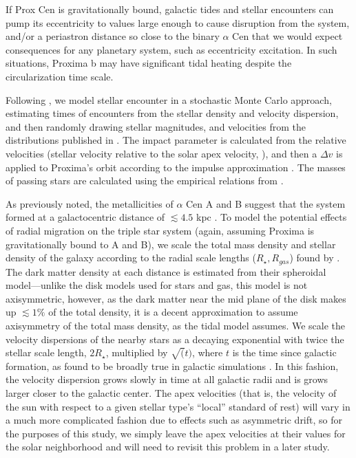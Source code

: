 \documentclass[preprint,12pt]{aastex}
\begin{document}
If Prox Cen is gravitationally bound, galactic tides and stellar 
encounters can pump its eccentricity to values large enough to 
cause disruption from the system, and/or a periastron distance 
so close to the binary $\alpha$ Cen that we would expect 
consequences for any planetary system, such as eccentricity 
excitation. In such situations, Proxima b may have significant tidal 
heating despite the circularization time scale. 

Following \cite{Heisler1987,Rickman2008}, we model stellar
encounter in a stochastic Monte Carlo approach, estimating times 
of encounters from the stellar density and velocity dispersion, 
and then randomly drawing stellar magnitudes, and velocities 
from the distributions published in \cite{Garciasanchez2001}. 
The impact parameter is calculated from the relative 
velocities (stellar velocity relative to the solar apex velocity, 
\cite[see][]{Rickman2008}), and then a $\Delta v$ is applied to
Proxima's orbit according to the impulse approximation
\citep{Remy1985}. The masses of passing stars are calculated 
using the empirical relations from \cite{Reid2002}.

As previously noted, the metallicities of $\alpha$ Cen A and B 
suggest that the system formed at a galactocentric distance of 
$\lesssim 4.5$ kpc \citep{Loebman16}. To model the potential 
effects of radial migration on the triple star system (again, 
assuming Proxima is gravitationally bound to A and B), we 
scale the total mass density and stellar density of the galaxy 
according to the radial scale lengths ($R_{\star}, R_{gas}$) found
by \cite{Kordopatis15}. The dark matter density at each distance 
is estimated from their spheroidal model---unlike the disk models 
used for stars and gas, this model is not axisymmetric, however, 
as the dark matter near the mid plane of the disk makes up 
$\lesssim 1\%$ of the total density, it is a decent approximation 
to assume axisymmetry of the total mass density, as the 
\cite{Heisler1986} tidal model assumes. We scale the velocity 
dispersions of the nearby stars as a decaying exponential 
with twice the stellar scale length, $2R_{\star}$, multiplied by 
$\sqrt(t)$, where $t$ is the time since galactic formation, as found 
to be broadly true in galactic simulations 
\cite{Minchev2012, Roskar2012}. In this fashion, the velocity 
dispersion grows slowly in time at all galactic radii and is grows 
larger closer to the galactic center. The apex velocities (that is,
the velocity of the sun with respect to a given stellar type's 
``local'' standard of rest) will vary 
in a much more complicated fashion due to effects such as 
asymmetric drift, so for the purposes of this study, we simply 
leave the apex velocities at their values for the solar 
neighborhood and will need to revisit this problem in a later study.
\end{document}
